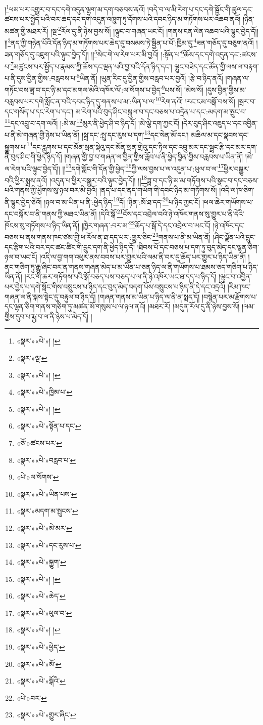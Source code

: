 །\footnote{«སྣར་»«པེ་»། །}ཕམ་པར་འགྱུར་བ་དང་དགེ་འདུན་ལྷག་མ་དག་བཅབས་ནའོ། །བདེ་བ་ལ་མི་རེག་པ་དང་དགེ་སྦྱོང་གི་ཚུལ་དང་ཚངས་པར་སྤྱོད་པའི་བར་ཆད་དང་དགེ་འདུན་འཁྲུག་ཏུ་དོགས་པའི་དབང་ཉིད་མ་གཏོགས་པར་འཆབ་ནའོ། །ཉིན་མཚན་གྱི་མཐར་རོ། །སྔ་\footnote{«སྣར་»ལྔ་}རོལ་དུ་ནི་ཉེས་བྱས་སོ། །ལྟུང་བ་གཞན་ཡང་ངོ། །གནས་ངན་ལེན་འཆབ་པའི་ལྟུང་བྱེད་དོ།། །།\footnote{«སྣར་»«པེ་»། །}ནད་ཀྱི་གཉེན་པོའི་དོན་ཉིད་མ་གཏོགས་པར་ཆེད་དུ་བསམས་ཏེ་སྦྱིན་པ་པོ་:ཁྱིམ་དུ་\footnote{«སྣར་»«པེ་»ཁྱིམ་པ་}ཟན་གཅོད་དུ་བཅུག་ནའོ། །ཟན་གཅོད་དུ་འཇུག་པའི་ལྟུང་བྱེད་དོ།། །།\footnote{«སྣར་»«པེ་»། །}སེང་གེ་ལ་རེག་པར་མི་བྱའོ། །:སྟོན་པ་\footnote{«སྣར་»«པེ་»སྟོན་པ་དང་}ཆོས་དང་དགེ་འདུན་དང་:ཚངས་པ་\footnote{«ཅོ་»ཚངས་པར་}མཚུངས་པར་སྤྱོད་པ་རྣམས་ཀྱི་ཆོས་དང་ལྡན་པའི་བྱ་བའི་དོན་ཉིད་དང་། ལྷུང་བཟེད་དང་ཚོན་གྱི་ལས་ལ་བརྟག་པ་ནི་དུས་བྱིན་གྱིས་:བརླབས་པ་\footnote{«སྣར་»«པེ་»བརླབ་པ་}ཡིན་ནོ། །ཡུན་རིང་དུ་བྱིན་གྱིས་བརླབ་པར་བྱའོ། །རྩེ་བ་ཉིད་ནའོ། །གཞན་ལ་གཏོང་བས་ཟླ་བ་དང་ཉི་མ་དང་མགལ་མེའི་འཁོར་ལོ་:ལ་སོགས་པ་བྱེད་\footnote{«པེ་»ལ་སོགས་}པས་སོ། །མེས་སོ། །དུས་བྱིན་གྱིས་མ་བརླབས་པར་དགེ་སློང་ན་བའི་དབང་ཉིད་དུ་གནས་པ་མ་:ཡིན་པ་ལ་\footnote{«སྣར་»«པེ་»ཡིན་པས་}རེག་ནའོ། །རང་ངམ་བསྒོ་བས་སོ། །སྦར་བ་དང་གསོད་པ་དང་རེག་པ་དང་། མ་རེག་པའི་བུད་ཤིང་བསྐུལ་བ་དང་བཅས་པ་འདྲེན་པ་དང་:མདག་མ་སྤུང་བ་\footnote{«སྣར་»མདག་མ་སྤུངས་}དང་འབྲུ་བ་དག་ལའོ། །:མེ་མ་\footnote{«སྣར་»«པེ་»མེ་མར་}མུར་ནི་ཕྱེད་ཤི་བ་ཉིད་དོ། །མེ་ལྕེ་དག་ཀྱང་ངོ། །དེར་བུད་ཤིང་འཇུད་པ་དང་འབྱིན་པ་ནི་མེ་གཞན་གྱི་ཉེས་པ་ཡིན་ནོ། །སྐྲ་དང་:སྤུ་དང་རུས་པ་དག་\footnote{«སྣར་»«པེ་»དང་རུས་པ་}དང་སེན་མོ་དང་། མཆིལ་མ་དང་སྣབས་དང་སྐྱུགས་པ་\footnote{«སྣར་»«པེ་»སྐྱུག་}དང་རླུགས་པ་དང་མོན་སྲན་སྡེའུ་དང་མོན་སྲན་གྲེའུ་དང་ཏིལ་དང་འབྲུ་མར་དང་སྦྲང་རྩི་དང་མར་དག་ནི་བུད་ཤིང་གི་ཕྱེད་ཉིད་དོ། །གཞན་གྱི་བྱ་བ་གཞན་ལ་བྱིན་གྱིས་རློབ་པ་ནི་ཕྱེད་བྱིན་གྱིས་བརླབས་པ་ཡིན་ནོ། །མེ་ལ་རེག་པའི་ལྟུང་བྱེད་དོ།། །།\footnote{«སྣར་»«པེ་»། །}དགེ་སློང་གི་དོན་གྱི་ཕྱེད་\footnote{«སྣར་»«པེ་»ཆེད་}ཀྱི་ལས་བྱས་པ་ལ་འདུན་པ་:ཕུལ་བ་ལ་\footnote{«སྣར་»«པེ་»ཕུལ་བ་}ཕྱིར་བསྒྱུར་བའི་ཕྱིར་སྨྲས་ནའོ། །འདུན་པ་ཕྱིར་བསྒྱུར་བའི་ལྟུང་བྱེད་དོ།། །།\footnote{«སྣར་»«པེ་»། །}ཟླ་བ་དང་ཉི་མ་མ་གཏོགས་པའི་སྣང་བ་དང་བཅས་པའི་གནས་ཀྱི་ཕྱོགས་སུ་ཉལ་བར་མི་བྱའོ། །ནད་པ་དང་ནད་གཡོག་གི་དབང་ཉིད་མ་གཏོགས་སོ། །འདི་ལ་ཁ་ཅིག་ནི་ལྟུང་བྱེད་ཅེའོ། །ཉལ་བ་མ་ཡིན་པ་ནི་:ཕྱེད་ཉིད་\footnote{«སྣར་»«པེ་»ཕྱེད་}དོ། །ཉིན་:མོ་ཐ་དད་\footnote{«སྣར་»«པེ་»མོ་}པ་ཉིད་ཀྱང་ངོ། །ཕལ་ཆེར་གཡོགས་པ་དང་བསྐོར་བ་ནི་གནས་ཀྱི་མཐའ་ཡིན་ནོ། །དེའི་སྒོ་\footnote{«སྣར་»«པེ་»སྒོའི་}ངོས་དང་འབྲེལ་བའི་ཉེ་འཁོར་གནས་སུ་གྱུར་པ་ནི་དེའི་ཁོངས་སུ་གཏོགས་པ་ཉིད་ཡིན་ནོ། །ཁྱེར་གཞན་:བར་མ་\footnote{«པེ་»བར་}ཆོད་པ་སྒོ་དེ་དང་འབྲེལ་བ་ཡང་ངོ། །ཉེ་འཁོར་དང་བཅས་པ་ནས་གནས་ཁང་ཙམ་གྱི་ཕ་རོལ་ན་ཐ་དད་པར་:གྱུར་ཅིང་\footnote{«སྣར་»«པེ་»གྱུར་ཞིང་}གནས་པ་ནི་མ་ཡིན་ནོ། །ཤིང་ལྗོན་པའི་དྲུང་དང་རྩིག་པའི་བར་དང་ཚང་ཚིང་གི་དྲུང་དག་ནི་ཕྱེད་ཉིད་དོ། །ཐིབས་པོ་དང་བཅས་པ་དག་ཏུ་བུད་མེད་དང་ལྷན་ཅིག་ཉལ་བ་ཡང་ངོ། །འདི་ལ་བྱ་གག་འཕུར་ནས་བབས་པར་གྱུར་པའི་ལམ་ནི་བར་དུ་ཆོད་པར་གྱུར་པ་ཉིད་ཡིན་ནོ། །ནང་གཅིག་ཏུ་རྒྱུ་ཞིང་བར་ན་གནས་གཞན་མེད་པ་མ་ཡིན་པ་ཅན་ཉིད་ལ་ནི་གཡོགས་པ་ཐམས་ཅད་གཅིག་པ་ཉིད་ཡིན་ནོ། །རང་གི་ཆར་གཏོགས་པའི་སྒོ་བཅད་པས་བཅད་པ་ལ་ནི་ཉེ་འཁོར་ཡང་ཐ་དད་པ་ཉིད་དོ། །ལྟུང་བ་འབྱིན་པར་བྱེད་པ་དགེ་སློང་གིས་བསྲུངས་པ་ཉིད་དང་བུད་མེད་བདག་པོས་བསྲུངས་པ་ཉིད་ནི་དེ་དང་འདྲའོ། །རིམ་ཁང་གཞན་ལ་ནི་སྐས་སྟེང་དུ་བརྟུལ་བ་ཉིད་དོ། །གཞན་གནས་མ་ཡིན་པ་ཉིད་ལ་ནི་ན་སྨད་དོ། །བསྙེན་པར་མ་རྫོགས་པ་དང་ལྷན་ཅིག་གནས་གཅིག་ཏུ་མཚན་མོ་གསུམ་པ་ལ་ཉལ་ནའོ། །མཐར་རོ། །མདུན་རོལ་དུ་ནི་ཉེས་བྱས་སོ། །ལམ་གྱིས་དུབ་པ་རྨྱ་བ་ལ་ནི་ཉེས་པ་མེད་དོ། །
